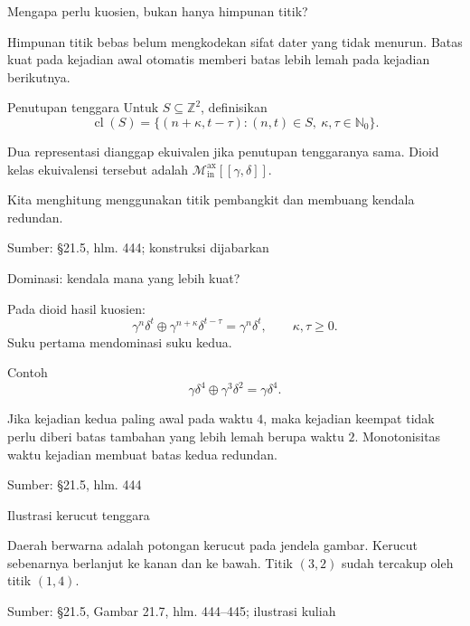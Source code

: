 \documentclass[aspectratio=169,11pt]{beamer}
\newcommand{\source}[1]{%
    \vfill
    \hfill{\tiny\color{gray}Sumber: #1}
}
\newcommand{\D}{\mathcal{M}_{\mathrm{in}}^{\mathrm{ax}}[[\gamma,\delta]]}
\newcommand{\N}{\mathbb N}
\begin{document}
\begin{frame}{Mengapa perlu kuosien, bukan hanya himpunan titik?}

Himpunan titik bebas belum mengkodekan sifat dater yang tidak menurun.
Batas kuat pada kejadian awal otomatis memberi batas lebih lemah pada kejadian berikutnya.
\begin{block}{Penutupan tenggara}
Untuk $S\subseteq\mathbb Z^2$, definisikan
\[
\operatorname{cl}(S)=
\{(n+\kappa,t-\tau):(n,t)\in S,\ \kappa,\tau\in\N_0\}.
\]
\end{block}
Dua representasi dianggap ekuivalen jika penutupan tenggaranya sama.
Dioid kelas ekuivalensi tersebut adalah $\D$.
\medskip

Kita menghitung menggunakan titik pembangkit dan membuang kendala redundan.

\source{\S21.5, hlm. 444; konstruksi dijabarkan}
\end{frame}
\begin{frame}{Dominasi: kendala mana yang lebih kuat?}


Pada dioid hasil kuosien:
\[
\gamma^n\delta^t\oplus\gamma^{n+\kappa}\delta^{t-\tau}
=\gamma^n\delta^t,\qquad\kappa,\tau\ge0.
\]
Suku pertama mendominasi suku kedua.
\begin{exampleblock}{Contoh}
\[
\gamma\delta^4\oplus\gamma^3\delta^2=\gamma\delta^4.
\]
\end{exampleblock}
Jika kejadian kedua paling awal pada waktu $4$, maka kejadian keempat
tidak perlu diberi batas tambahan yang lebih lemah berupa waktu $2$.
Monotonisitas waktu kejadian membuat batas kedua redundan.

\source{\S21.5, hlm. 444}

\end{frame}
\begin{frame}{Ilustrasi kerucut tenggara}


\begin{center}\end{center}
Daerah berwarna adalah potongan kerucut pada jendela gambar.
Kerucut sebenarnya berlanjut ke kanan dan ke bawah.
Titik $(3,2)$ sudah tercakup oleh titik $(1,4)$.

\source{\S21.5, Gambar 21.7, hlm. 444--445; ilustrasi kuliah}

\end{frame}
\end{document}
